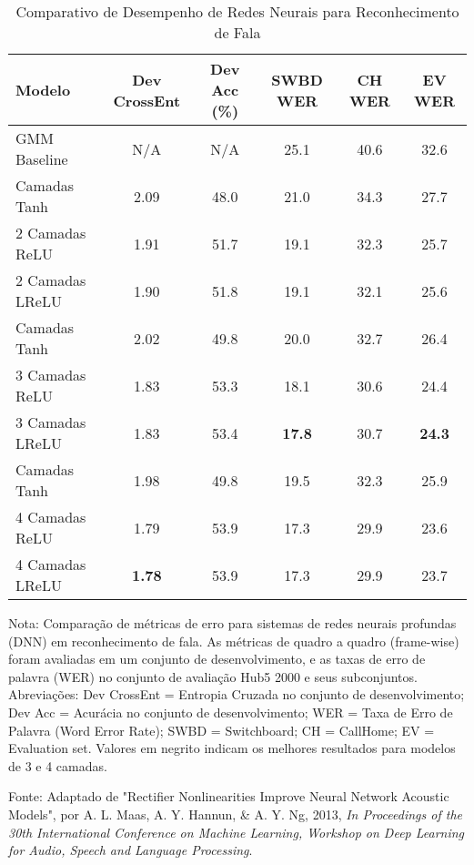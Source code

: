 \begin{table}[ht]
    \centering
    \begin{threeparttable}
        \caption{Comparativo de Desempenho de Redes Neurais para Reconhecimento de Fala}
        \label{tab:leaky-relu-desempenho}
        \begin{tabular}{lccccc}
            \toprule
            \textbf{Modelo} & \textbf{Dev CrossEnt} & \textbf{Dev Acc (\%)} & \textbf{SWBD WER} & \textbf{CH WER} & \textbf{EV WER} \\
            \midrule
            
            GMM Baseline & N/A & N/A & 25.1 & 40.6 & 32.6 \\ 
            \addlinespace %
            2 Camadas Tanh  & 2.09 & 48.0 & 21.0 & 34.3 & 27.7 \\
            2 Camadas ReLU  & 1.91 & 51.7 & 19.1 & 32.3 & 25.7 \\
            2 Camadas LReLU & 1.90 & 51.8 & 19.1 & 32.1 & 25.6 \\ 
            \addlinespace
            3 Camadas Tanh  & 2.02 & 49.8 & 20.0 & 32.7 & 26.4 \\
            3 Camadas ReLU  & 1.83 & 53.3 & 18.1 & 30.6 & 24.4 \\
            3 Camadas LReLU & 1.83 & 53.4 & \textbf{17.8} & 30.7 & \textbf{24.3} \\ 
            \addlinespace
            4 Camadas Tanh  & 1.98 & 49.8 & 19.5 & 32.3 & 25.9 \\
            4 Camadas ReLU  & 1.79 & 53.9 & 17.3 & 29.9 & 23.6 \\
            4 Camadas LReLU & \textbf{1.78} & 53.9 & 17.3 & 29.9 & 23.7 \\
            
            \bottomrule
        \end{tabular}
        
        \begin{tablenotes}[para]
            \small
            \item[] Nota: Comparação de métricas de erro para sistemas de redes neurais profundas (DNN) em reconhecimento de fala. As métricas de quadro a quadro (frame-wise) foram avaliadas em um conjunto de desenvolvimento, e as taxas de erro de palavra (WER) no conjunto de avaliação Hub5 2000 e seus subconjuntos. Abreviações: Dev CrossEnt = Entropia Cruzada no conjunto de desenvolvimento; Dev Acc = Acurácia no conjunto de desenvolvimento; WER = Taxa de Erro de Palavra (Word Error Rate); SWBD = Switchboard; CH = CallHome; EV = Evaluation set. Valores em negrito indicam os melhores resultados para modelos de 3 e 4 camadas.
            \item[] Fonte: Adaptado de "Rectifier Nonlinearities Improve Neural Network Acoustic Models", por A. L. Maas, A. Y. Hannun, \& A. Y. Ng, 2013, \textit{In Proceedings of the 30th International Conference on Machine Learning, Workshop on Deep Learning for Audio, Speech and Language Processing}.
        \end{tablenotes}
        

\end{threeparttable}
\end{table}
